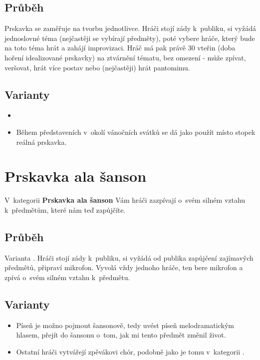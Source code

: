 \subsection{Průběh} Prskavka se zaměřuje na tvorbu jednotlivce. 
Hráči stojí zády k~publiku,  si vyžádá jednoslovné téma (nejčastěji se vybírají předměty), poté vybere hráče, který bude na toto téma hrát a zahájí improvizaci. Hráč má pak právě 30 vteřin (doba hoření idealizované prskavky) na ztvárnění tématu, bez omezení - může zpívat, veršovat, hrát více postav nebo (nejčastěji) hrát pantomimu. 
 
\subsection{ Varianty } \begin{itemize}
\item {}
\item Během představeních v~okolí vánočních svátků se dá jako  použít místo stopek reálná prskavka.
\end{itemize}
 
 
 
 
 
\needspace{5cm} \section{Prskavka ala šanson} \label{prskavka ala šanson}  
V~kategorii \textbf{Prskavka ala šanson} Vám hráči zazpívají o~svém silném vztahu k~předmětům, které nám teď zapůjčíte.  
 
\subsection{Průběh} Varianta . Hráči stojí zády k~publiku,  si vyžádá od publika zapůjčení zajímavých předmětů, připraví mikrofon. 
Vyvolá vždy jednoho hráče, ten bere mikrofon a  zpívá   o~svém silném vztahu k~předmětu.  
 
\subsection{Varianty} \begin{itemize}
\item  Píseň je možno pojmout šansonově, tedy uvést píseň melodramatickým hlasem, přejít do šansonu o~tom, jak mi tento předmět změnil život.
\item  Ostatní hráči vytvářejí zpěvákovi chór, podobně jako je tomu v~kategorii .
\end{itemize}
 
